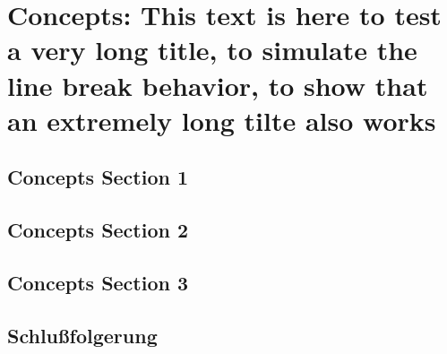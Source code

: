 %
\chapter{Concepts: This text is here to test a very long title, to simulate the line break behavior, to show that an extremely long tilte also works}
\label{sec:concepts}



\section{Concepts Section 1}
\label{sec:concepts:sec1}


\section{Concepts Section 2}
\label{sec:concepts:sec2}


\section{Concepts Section 3}
\label{sec:concepts:sec3}


\section{Schlußfolgerung}
\label{sec:concepts:Schlußfolgerung}

